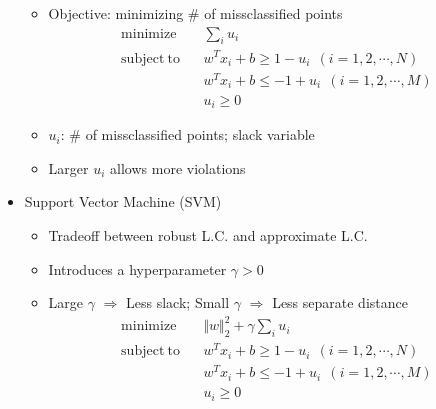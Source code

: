 \begin{itemize}
\begin{itemize}
        \item Objective: minimizing \# of missclassified points
        \begin{equation}\begin{aligned}
            \mathrm{minimize}~~&~~\sum_{i}u_i \\
            \mathrm{subject~to}~~&~~w^Tx_i+b\geq1-u_i~~(i=1,2,\cdots,N) \\
                &~~w^Tx_i+b\leq-1+u_i~~(i=1,2,\cdots,M) \\
                &~~u_i\geq 0
        \end{aligned}\end{equation}
        \item $u_i$: \# of missclassified points; slack variable
        \item Larger $u_i$ allows more violations
    \end{itemize}
    \item Support Vector Machine (SVM)
    \begin{itemize}
        \item Tradeoff between robust L.C. and approximate L.C.
        \item Introduces a hyperparameter $\gamma>0$
        \item Large $\gamma$ $\Rightarrow$ Less slack; Small $\gamma$ $\Rightarrow$ Less separate distance
        \begin{equation}\begin{aligned}
            \mathrm{minimize}~~&~~\Vert w\Vert_2^2+\gamma\sum_{i}u_i \\
            \mathrm{subject~to}~~&~~w^Tx_i+b\geq1-u_i~~(i=1,2,\cdots,N) \\
                &~~w^Tx_i+b\leq-1+u_i~~(i=1,2,\cdots,M) \\
                &~~u_i\geq0
        \end{aligned}\end{equation}
    \end{itemize}
\end{itemize}
\begin{figures}
\end{figures}

